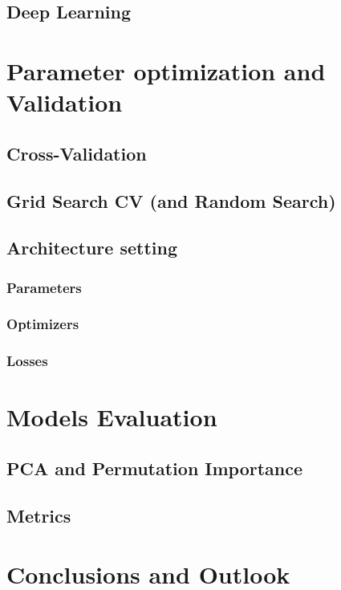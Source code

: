\documentclass{article}
\begin{document}
\subsection{Deep Learning}




\section{Parameter optimization and Validation}

\subsection{Cross-Validation}

\subsection{Grid Search CV (and Random Search)}

\subsection{Architecture setting}

\subsubsection{Parameters}

\subsubsection{Optimizers}

\subsubsection{Losses}


\section{Models Evaluation}

\subsection{PCA and Permutation Importance}

\subsection{Metrics}




\section{Conclusions and Outlook}









\end{document}
